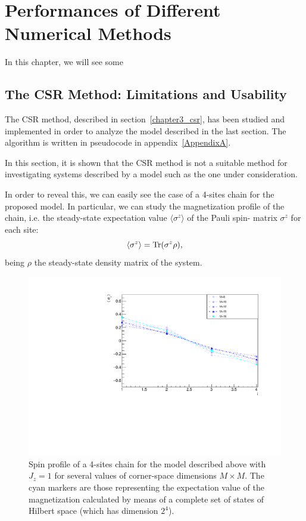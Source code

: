 \chapter{Performances of Different Numerical Methods}
\label{chapter5}

In this chapter, we will see some 

\section{The CSR Method: Limitations and Usability}
The CSR method, described in section~\ref{chapter3_csr}, has been studied and implemented in order to analyze the model described in the last section. The algorithm is written in pseudocode in appendix~\ref{AppendixA}.

In this section, it is shown that the CSR method is not a suitable method for investigating systems described by a model such as the one under consideration.

In order to reveal this, we can easily see the case of a 4-sites chain for the proposed model. In particular, we can study the magnetization profile of the chain, i.e. the steady-state expectation value $\langle \sigma^z \rangle$ of the Pauli spin- matrix $\sigma^z$ for each site:
\begin{equation*}
    \langle \sigma^z \rangle = \operatorname{Tr}(\sigma^z \rho),
\end{equation*}
being $\rho$ the steady-state density matrix of the system.

\begin{figure}[H]
    \centering
    \includegraphics[scale=0.7]{Figures/4sites/4sites_LM_convergenceIncreasingM.pdf}
    \captionsetup{width=1.\linewidth}
    \caption{Spin profile of a 4-sites chain for the model described above with $J_z=1$ for several values of corner-space dimensions $M \times M$. The cyan markers are those representing the expectation value of the magnetization calculated by means of a complete set of states of Hilbert space (which has dimension $2^4$).}
    \label{fig:4sites_LM_convergenceIncreasingM}
\end{figure}

